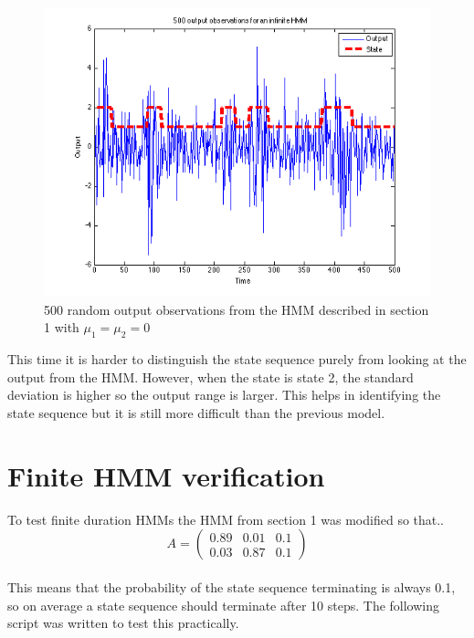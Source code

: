 \documentclass[11pt]{article}   %
\begin{document}
\begin{figure}[H]
\begin{center}
\leavevmode
\includegraphics[width=1\textwidth]{identicalMeanHMM.png}
\end{center}
\caption{500 random output observations from the HMM described in section 1 with $\mu_1 = \mu_2 = 0$}
\label{euler:1}
\end{figure}

This time it is harder to distinguish the state sequence purely from looking at the output from the HMM. However, when the state is state 2, the standard deviation is higher so the output range is larger. This helps in identifying the state sequence but it is still more difficult than the previous model.

\newpage

\section{Finite HMM verification}

To test finite duration HMMs the HMM from section 1 was modified so that..\\

 $$A = \begin{pmatrix} 0.89 & 0.01 & 0.1\\ 0.03 & 0.87 & 0.1 \end{pmatrix} $$\\
 
This means that  the probability of the state sequence terminating is always 0.1, so on average a state sequence should terminate after 10 steps. The following script was written to test this practically.
\end{document}
